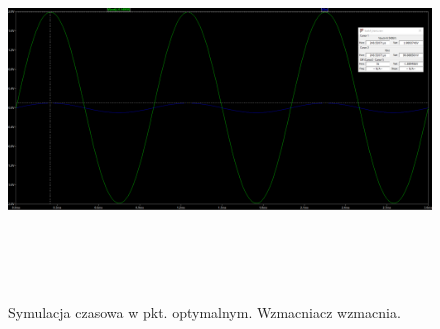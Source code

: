 \documentclass{article}
\begin{document}
\pagebreak
\begin{landscape}
	\begin{figure}[h]
		\vspace*{-2cm}
		\includegraphics[width=20cm,height=10cm]{graphics/optim_tran.png}
		\centering
		\caption{Symulacja czasowa w pkt. optymalnym. Wzmacniacz wzmacnia.}
	\end{figure}
\end{landscape}
\end{document}
